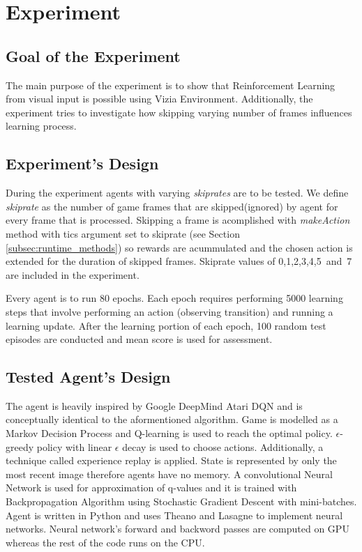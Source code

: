 \chapter{Experiment}\label{ch:experiment}

\section{Goal of the Experiment}
The main purpose of the experiment is to show that Reinforcement Learning from visual input is possible using Vizia Environment. 	
Additionally, the experiment tries to investigate how skipping varying number of frames influences learning process.

\section{Experiment's Design}
During the experiment agents with varying \emph{skiprates} are to be tested. We define \emph{skiprate} as the number of game frames that are skipped(ignored) by agent for every frame that is processed. Skipping a frame is acomplished with \emph{makeAction} method with tics argument set to skiprate (see Section \ref{subsec:runtime_methods}) so rewards are acummulated and the chosen action is extended for the duration of skipped frames. Skiprate values of 0,1,2,3,4,5~and~7 are included in the experiment. 

Every agent is to run 80 epochs. Each epoch requires performing 5000 learning steps that involve performing an action (observing transition) and running a learning update. After the learning portion of each epoch, 100 random test episodes are conducted and mean score is used for assessment.  

\section{Tested Agent's Design}
	The agent is heavily inspired by Google DeepMind Atari DQN \cite{mnih-dqn-2015}\cite{mnih-atari-2013} and is conceptually identical to the aformentioned algorithm. Game is modelled as a Markov Decision Process and Q-learning\cite{watkins:mlj92} is used to reach the optimal policy. $\epsilon$-greedy policy with linear $\epsilon$ decay is used to choose actions. Additionally, a technique called experience replay\cite{mnih-dqn-2015} is applied. State is represented by only the most recent image therefore agents have no memory. A convolutional Neural Network is used for approximation of q-values and it is trained with Backpropagation Algorithm\cite{lecun-98b} using Stochastic Gradient Descent with mini-batches. Agent is written in Python and uses Theano\cite{Bastien-Theano-2012}\cite{bergstra+al:2010-scipy} and Lasagne\cite{sander_dieleman_2015_27878} to implement neural networks. Neural network's forward and backword passes are computed on GPU whereas the rest of the code runs on the CPU.

